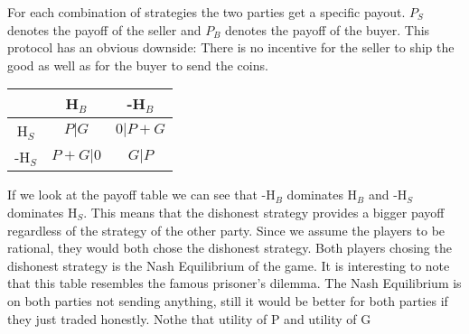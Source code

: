 \documentclass{cacthesis}
\begin{document}
For each combination of strategies the two parties get a specific payout. $P_S$ denotes the payoff of the seller and $P_B$ denotes the payoff of the buyer.
\newline
This protocol has an obvious downside: There is no incentive for the seller to ship the good as well as for the buyer to send the coins. \newline




\begin{center}
\begin{tabular}{ c||c|c| }
& H$_B$ & -H$_B$  \\
\hline
\hline
H$_S$ & $P | G$ & $0 | P+G$ \\
\hline
-H$_S$ & $P + G | 0$ & $G | P$ \\ 
\hline
\end{tabular}
\end{center}

If we look at the payoff table we can see that -H$_B$ dominates H$_B$ and -H$_S$ dominates H$_S$. This means that the dishonest strategy provides a bigger payoff regardless of the strategy of the other party. \newline
Since we assume the players to be rational, they would both chose the dishonest strategy. Both players chosing the dishonest strategy is the Nash Equilibrium of the game.\newline
It is interesting to note that this table resembles the famous prisoner's dilemma.
The Nash Equilibrium is on both parties not sending anything, still it would be better for both parties if they just traded honestly. Nothe that utility of P and utility of G
\end{document}
